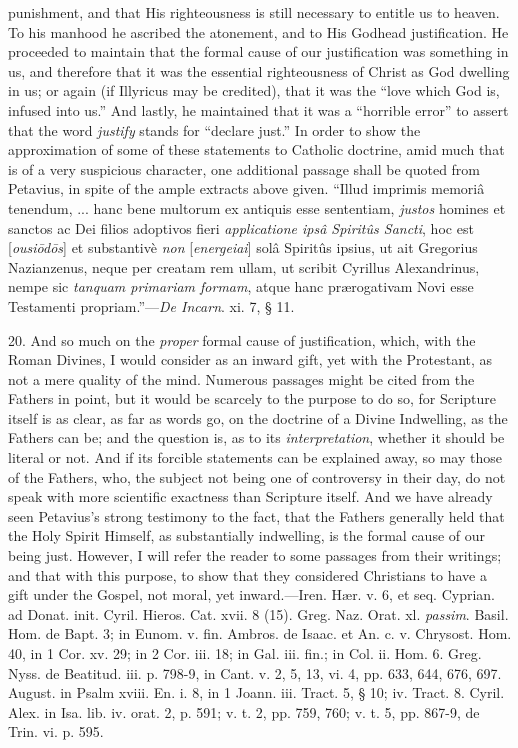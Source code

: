 punishment, and that His righteousness is still necessary to entitle
us to heaven. To his manhood he ascribed the atonement, and to His
Godhead justification. He proceeded to maintain that the formal cause
of our justification was something in us, and therefore that it was
the essential righteousness of Christ as God dwelling in us; or again
(if Illyricus may be credited), that it was the ``love which God
is, infused into us.'' And lastly, he maintained that it was a
``horrible error'' to assert that the word \emph{justify}
stands for ``declare just.'' In order to show the
approximation of some of these statements to Catholic doctrine, amid
much that is of a very suspicious character, one additional passage
shall be quoted from Petavius, in spite of the ample extracts above
given. ``Illud imprimis memoriâ tenendum, ... hanc bene multorum
ex antiquis esse sententiam, \emph{justos} homines et sanctos ac Dei
filios adoptivos fieri \emph{applicatione ipsâ Spiritûs Sancti}, hoc
est [\emph{ousi\={o}d\={o}s}]
et substantivè \emph{non} [\emph{energeiai}] solâ Spiritûs
ipsius, ut ait Gregorius Nazianzenus, neque per creatam rem
ullam, ut scribit Cyrillus Alexandrinus, nempe sic \emph{tanquam
primariam formam}, atque hanc prærogativam Novi esse Testamenti
propriam.''—\emph{De Incarn}. xi. 7, § 11.

20. And so much on the \emph{proper} formal cause of justification,
which, with the Roman Divines, I would consider as an inward gift, yet
with the Protestant, as not a mere quality of the mind. Numerous
passages might be cited from the Fathers in point, but it would be
scarcely to the purpose to do so, for Scripture itself is as clear, as
far as words go, on the doctrine of a Divine Indwelling, as the
Fathers can be; and the question is, as to its \emph{interpretation},
whether it should be literal or not. And if its forcible statements
can be explained away, so may those of the Fathers, who, the subject
not being one of controversy in their day, do not speak with more
scientific exactness than Scripture itself. And we have already seen
Petavius's strong testimony to the fact, that the Fathers generally
held that the Holy Spirit Himself, as substantially indwelling, is the
formal cause of our being just. However, I will refer the reader to
some passages from their writings; and that with this purpose, to show
that they considered Christians to have a gift under the Gospel, not
moral, yet inward.—Iren. Hær. v. 6, et seq. Cyprian. ad Donat.
init. Cyril. Hieros. Cat. xvii. 8 (15). Greg. Naz. Orat. xl. \emph{passim}.
Basil. Hom. de Bapt. 3; in Eunom. v. fin. Ambros. de Isaac. et An. c.
v. Chrysost. Hom. 40, in 1 Cor. xv. 29; in 2 Cor. iii. 18; in Gal.
iii. fin.; in Col. ii. Hom. 6. Greg. Nyss. de Beatitud. iii. p. 798-9,
in Cant. v. 2, 5, 13, vi. 4, pp. 633, 644, 676, 697. August. in Psalm
xviii. En. i. 8, in 1 Joann. iii. Tract. 5, § 10; iv. Tract. 8.
Cyril. Alex. in Isa. lib. iv. orat. 2, p. 591; v. t. 2, pp. 759, 760;
v. t. 5, pp. 867-9, de Trin. vi. p. 595.

